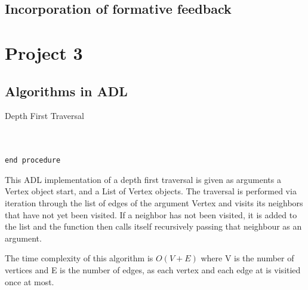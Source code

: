 \documentclass[a4paper]{article}
\begin{document}
\subsection{Incorporation of formative feedback}





\newpage


\section{Project 3}
\subsection{Algorithms in ADL}

\makeatletter
\renewcommand{\ALG@name}{Algorithm}
\makeatother
\setcounter{algorithm}{0}

\begin{algorithm}
\caption{Depth First Traversal}\label{euclid}
\begin{algorithmic}[1]

 \\
\State{}
\State{}
\State\quad{}
\State\quad{}
\State{}
 \\
{\tt end procedure}

\EndProcedure
\end{algorithmic}
\end{algorithm}

This ADL implementation of a depth first traversal 
is given as arguments
a Vertex object start,
and a List of Vertex objects.
The traversal is performed via
iteration through the list of edges of the argument Vertex
and visits its neighbors that have not yet been visited.
If a neighbor has not been visited, it is added to the list and the function then calls itself 
recursively passing that neighbour as an argument.

The time complexity of this algorithm is $O(V+E)$ where V is the number of vertices and E is the number of edges,
as each vertex and each edge at is visitied once at most. \\
\end{document}

